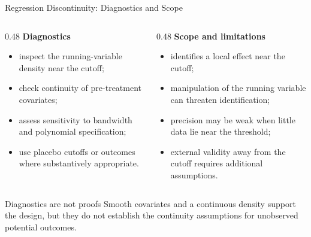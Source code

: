 \documentclass[aspectratio=169,11pt]{beamer}
\begin{document}
\begin{frame}{Regression Discontinuity: Diagnostics and Scope}
\begin{columns}
\begin{column}{0.48\textwidth}
\textbf{Diagnostics}
\begin{itemize}
  \item inspect the running-variable density near the cutoff;
  \item check continuity of pre-treatment covariates;
  \item assess sensitivity to bandwidth and polynomial specification;
  \item use placebo cutoffs or outcomes where substantively appropriate.
\end{itemize}
\end{column}

\begin{column}{0.48\textwidth}
\textbf{Scope and limitations}
\begin{itemize}
  \item identifies a local effect near the cutoff;
  \item manipulation of the running variable can threaten identification;
  \item precision may be weak when little data lie near the threshold;
  \item external validity away from the cutoff requires additional assumptions.
\end{itemize}
\end{column}
\end{columns}

\begin{alertblock}{Diagnostics are not proofs}
Smooth covariates and a continuous density support the design, but they do not establish the continuity assumptions for unobserved potential outcomes.
\end{alertblock}
\end{frame}
\end{document}
